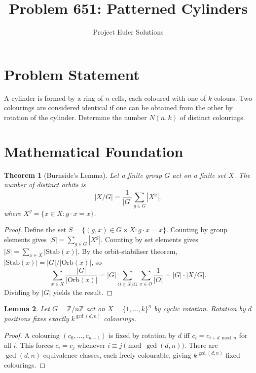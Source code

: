 \documentclass[11pt]{article}
\title{Problem 651: Patterned Cylinders}
\author{Project Euler Solutions}
\date{}
\newtheorem{theorem}{Theorem}
\newtheorem{lemma}[theorem]{Lemma}
\begin{document}
\maketitle

\section{Problem Statement}

A cylinder is formed by a ring of $n$ cells, each coloured with one of $k$ colours. Two colourings are considered identical if one can be obtained from the other by rotation of the cylinder. Determine the number $N(n,k)$ of distinct colourings.

\section{Mathematical Foundation}

\begin{theorem}[Burnside's Lemma]
Let a finite group $G$ act on a finite set $X$. The number of distinct orbits is
\[
|X/G| = \frac{1}{|G|}\sum_{g \in G} |X^g|,
\]
where $X^g = \{x \in X : g \cdot x = x\}$.
\end{theorem}

\begin{proof}
Define the set $S = \{(g,x) \in G \times X : g \cdot x = x\}$. Counting by group elements gives $|S| = \sum_{g \in G}|X^g|$. Counting by set elements gives $|S| = \sum_{x \in X}|\mathrm{Stab}(x)|$. By the orbit-stabiliser theorem, $|\mathrm{Stab}(x)| = |G|/|\mathrm{Orb}(x)|$, so
\[
\sum_{x \in X} \frac{|G|}{|\mathrm{Orb}(x)|} = |G| \sum_{O \in X/G} \sum_{x \in O} \frac{1}{|O|} = |G| \cdot |X/G|.
\]
Dividing by $|G|$ yields the result.
\end{proof}

\begin{lemma}
Let $G = \mathbb{Z}/n\mathbb{Z}$ act on $X = \{1,\ldots,k\}^n$ by cyclic rotation. Rotation by $d$ positions fixes exactly $k^{\gcd(d,n)}$ colourings.
\end{lemma}

\begin{proof}
A colouring $(c_0, \ldots, c_{n-1})$ is fixed by rotation by $d$ iff $c_i = c_{i+d \bmod n}$ for all $i$. This forces $c_i = c_j$ whenever $i \equiv j \pmod{\gcd(d,n)}$. There are $\gcd(d,n)$ equivalence classes, each freely colourable, giving $k^{\gcd(d,n)}$ fixed colourings.
\end{proof}
\end{document}
